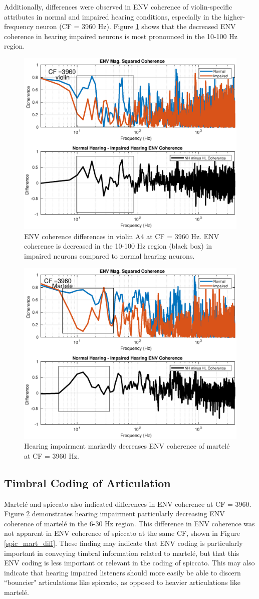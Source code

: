 \documentclass[conference]{IEEEtran}
\begin{document}
Additionally, differences were observed in ENV coherence of violin-specific attributes in normal and impaired hearing conditions, especially in the higher-frequency neuron (CF = 3960 Hz). Figure \ref{viol_env} shows that the decreased ENV coherence in hearing impaired neurons is most pronounced in the 10-100 Hz region. 

\begin{figure}[h]
\includegraphics[width = .5\textwidth]{violin_ENV_COH_3960}
\caption{ENV coherence differences in violin A4 at CF = 3960 Hz. ENV coherence is decreased in the 10-100 Hz region (black box) in impaired neurons compared to normal hearing neurons.}
\label{viol_env}
\end{figure} 

\begin{figure}[h]
\includegraphics[width = .5\textwidth]{martele_ENV_diff}
\caption{Hearing impairment markedly decreases ENV coherence of martel\'{e} at CF = 3960 Hz. }
\label{mart_env}
\end{figure} 

\subsection{Timbral Coding of Articulation}

Martel\'{e} and spiccato also indicated differences in ENV coherence at CF = 3960. Figure \ref{mart_env} demonstrates hearing impairment particularly decreasing ENV coherence of martel\'{e} in the 6-30 Hz region. This difference in ENV coherence was not apparent in ENV coherence of spiccato at the same CF, shown in Figure \ref{spic_mart_diff}. These finding may indicate that ENV coding is particularly important in conveying timbral information related to martel\'{e}, but that this ENV coding is less important or relevant in the coding of spiccato. This may also indicate that hearing impaired listeners should more easily be able to discern ``bouncier" articulations like spiccato, as opposed to heavier articulations like martel\'{e}. 
\end{document}
